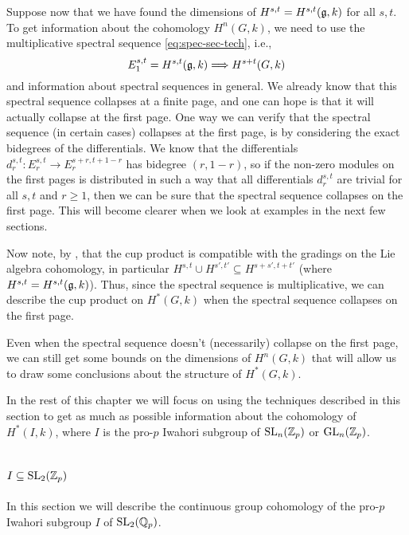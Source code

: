Suppose now that we have found the dimensions of $H^{s,t} = H^{s,t}(\mathfrak{g},k)$ for all $s,t$. To get information about the cohomology $H^{n}(G,k)$, we need to use the multiplicative spectral sequence \eqref{eq:spec-sec-tech}, i.e.,
\begin{equation*}
  E_{1}^{s,t} = H^{s,t}(\mathfrak{g}, k) \Longrightarrow H^{s+t}(G,k)
\end{equation*}
and information about spectral sequences in general. We already know that this spectral sequence collapses at a finite page, and one can hope is that it will actually collapse at the first page. One way we can verify that the spectral sequence (in certain cases) collapses at the first page, is by considering the exact bidegrees of the differentials. We know that the differentials $d_{r}^{s,t} \colon E_{r}^{s,t} \to E_{r}^{s+r,t+1-r}$ has bidegree $(r,1-r)$, so if the non-zero modules on the first pages is distributed in such a way that all differentials $d_{r}^{s,t}$ are trivial for all $s,t$ and $r\geq1$, then we can be sure that the spectral sequence collapses on the first page. This will become clearer when we look at examples in the next few sections.

Now note, by \cite[§3.7]{Fuks}, that the cup product is compatible with the gradings on the Lie algebra cohomology, in particular $H^{s,t} \cup H^{s',t'} \subseteq H^{s+s',t+t'}$ (where $H^{s,t} = H^{s,t}(\mathfrak{g},k)$). Thus, since the spectral sequence is multiplicative, we can describe the cup product on $H^{*}(G,k)$ when the spectral sequence collapses on the first page.

Even when the spectral sequence doesn't (necessarily) collapse on the first page, we can still get some bounds on the dimensions of $H^{n}(G,k)$ that will allow us to draw some conclusions about the structure of $H^{*}(G,k)$.

In the rest of this chapter we will focus on using the techniques described in this section to get as much as possible information about the cohomology of $H^{*}(I,k)$, where $I$ is the pro-$p$ Iwahori subgroup of $\operatorname{SL}_{n}(\mathbb{Z}_{p})$ or $\operatorname{GL}_{n}(\mathbb{Z}_{p})$.


\section{\texorpdfstring{$I \subseteq \operatorname{SL}_{2}(\mathbb{Z}_{p})$}{I in SL2(Zp)}}%
\label{sec:Iwa-SL2}

In this section we will describe the continuous group cohomology of the pro-$p$ Iwahori subgroup $I$ of $\operatorname{SL}_{2}(\mathbb{Q}_{p})$.

